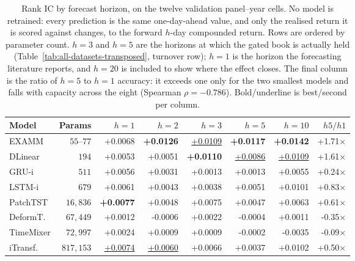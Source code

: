 \begin{table}[t]
\centering
\caption{Rank IC by forecast horizon, on the twelve validation panel--year cells. No model is retrained: every prediction is the same one-day-ahead value, and only the realised return it is scored against changes, to the forward $h$-day compounded return. Rows are ordered by parameter count. $h{=}3$ and $h{=}5$ are the horizons at which the gated book is actually held (Table~\ref{tab:all-datasets-transposed}, turnover row); $h{=}1$ is the horizon the forecasting literature reports, and $h{=}20$ is included to show where the effect closes. The final column is the ratio of $h{=}5$ to $h{=}1$ accuracy: it exceeds one only for the two smallest models and falls with capacity across the eight (Spearman $\rho = -0.786$). Bold/underline is best/second per column.}
\label{tab:horizon}
\begin{tabular}{lrrrrrrr}
\toprule
Model & Params & $h{=}1$ & $h{=}2$ & $h{=}3$ & $h{=}5$ & $h{=}10$ & $h5/h1$ \\
\midrule
EXAMM & $55$--$77$ & +0.0068 & \textbf{+0.0126} & \underline{+0.0109} & \textbf{+0.0117} & \textbf{+0.0142} & +1.71$\times$ \\
DLinear & $194$ & +0.0053 & +0.0051 & \textbf{+0.0110} & \underline{+0.0086} & \underline{+0.0109} & +1.61$\times$ \\
GRU-i & $511$ & +0.0056 & +0.0031 & +0.0013 & +0.0013 & +0.0055 & +0.24$\times$ \\
LSTM-i & $679$ & +0.0061 & +0.0043 & +0.0038 & +0.0051 & +0.0101 & +0.83$\times$ \\
PatchTST & $16{,}836$ & \textbf{+0.0077} & +0.0048 & +0.0075 & +0.0047 & +0.0063 & +0.61$\times$ \\
DeformT. & $67{,}449$ & +0.0012 & -0.0006 & +0.0022 & -0.0004 & +0.0011 & -0.35$\times$ \\
TimeMixer & $72{,}997$ & +0.0024 & +0.0009 & +0.0009 & -0.0002 & -0.0035 & -0.09$\times$ \\
iTransf. & $817{,}153$ & \underline{+0.0074} & \underline{+0.0060} & +0.0066 & +0.0037 & +0.0102 & +0.50$\times$ \\
\bottomrule
\end{tabular}
\end{table}
